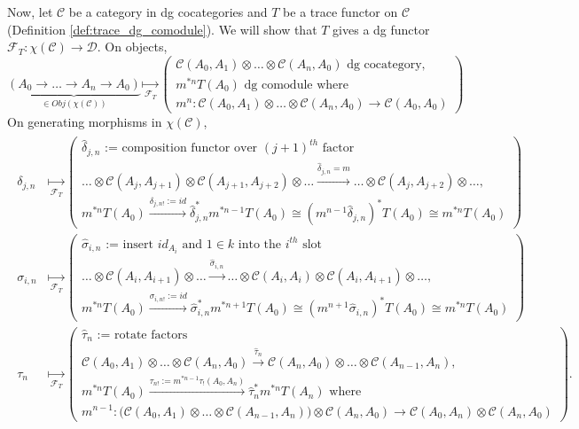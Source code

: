 Now, let $\mathcal{C}$ be a category in dg cocategories 
and $T$ be a trace functor on $\mathcal{C}$ 
(Definition \ref{def:trace_dg_comodule}). We will show 
that $T$ gives a dg functor $\mathcal{F}_T: 
\chi(\mathcal{C}) \to \mathcal{D}$. On objects,
$$
\underbrace{(A_0 \to \dots \to A_n \to A_0)}_{\in Obj(\chi(\mathcal{C}))}
\underset{\mathcal{F}_T}{\mapsto} 
\begin{pmatrix}
	\mathcal{C}(A_0,A_1) \otimes \dots \otimes \mathcal{C}(A_n,A_0)
	\textrm{ dg cocategory,}\\
	m^{*n} T(A_0) \textrm{ dg comodule where }\\
	m^n: \mathcal{C}(A_0,A_1) \otimes \dots \otimes \mathcal{C}(A_n,A_0) \to \mathcal{C}(A_0,A_0)
\end{pmatrix}
$$
On generating morphisms in $\chi(\mathcal{C})$, 
\begin{align} \label{eq:trace_induced_dg}
\begin{split}
\delta_{j,n}
&\underset{\mathcal{F}_T}{\mapsto} 
\begin{pmatrix}
	\textrm{$\hat{\delta}_{j,n}$ := composition functor over $(j+1)^{th}$ factor}\\
	\dots \otimes \mathcal{C}(A_j,A_{j+1})
	\otimes \mathcal{C}(A_{j+1},A_{j+2}) \otimes \dots
	\xrightarrow{\hat{\delta}_{j,n}=m}
	\dots \otimes \mathcal{C}(A_j,A_{j+2}) \otimes \dots,\\
	m^{*n}T(A_0)
	\xrightarrow{\delta_{j,n!} := id}
	\hat{\delta}_{j,n}^* m^{*n-1}T(A_0)
	\cong (m^{n-1}\hat{\delta}_{j,n})^* T(A_0)
	\cong m^{*n} T(A_0)
\end{pmatrix}\\
%
\sigma_{i,n}
&\underset{\mathcal{F}_T}{\mapsto} 
\begin{pmatrix}
	\textrm{$\hat{\sigma}_{i,n}$ := insert $id_{A_i}$ and $1\in k$ 
	into the $i^{th}$ slot}\\
	\dots \otimes \mathcal{C}(A_i,A_{i+1})
	\otimes \dots
	\xrightarrow{\hat{\sigma}_{i,n}}
	\dots \otimes \mathcal{C}(A_i,A_i) 
	\otimes \mathcal{C}(A_i,A_{i+1}) \otimes \dots,\\
	m^{*n}T(A_0)
	\xrightarrow{\sigma_{i,n!} := id}
	\hat{\sigma}_{i,n}^* m^{*n+1}T(A_0)
	\cong (m^{n+1}\hat{\sigma}_{i,n})^* T(A_0)
	\cong m^{*n} T(A_0)
\end{pmatrix}\\
%
\tau_n
&\underset{\mathcal{F}_T}{\mapsto} 
\begin{pmatrix}
	\textrm{$\hat{\tau}_n$ := rotate factors}\\
	\mathcal{C}(A_0,A_1) \otimes \dots 
	\otimes \mathcal{C}(A_n,A_0)
	\xrightarrow{\hat{\tau}_n}
	\mathcal{C}(A_n,A_0) \otimes \dots 
	\otimes \mathcal{C}(A_{n-1},A_n),\\
	m^{*n}T(A_0)
	\xrightarrow{\tau_{n!} := m^{*n-1} \tau_!(A_0,A_n)}
	\hat{\tau}_n^* m^{*n}T(A_n) \textrm{ where}\\
	m^{n-1}: 
	\big( \mathcal{C}(A_0,A_1) \otimes \dots \otimes 
	\mathcal{C}(A_{n-1},A_n) \big) \otimes \mathcal{C}(A_n,A_0)
	\to \mathcal{C}(A_0,A_n) \otimes \mathcal{C}(A_n,A_0)
\end{pmatrix}.
\end{split}
\end{align}

